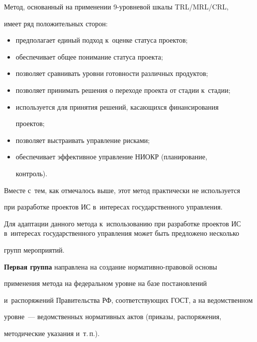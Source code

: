   Метод, основанный на применении 9-уров\-не\-вой шкалы TRL\!/\!MRL\!/\!CRL, 

имеет ряд положительных сторон:

  \begin{itemize}

  \item  предполагает единый подход к~оценке статуса проектов;

  \item обеспечивает общее понимание статуса проекта;

  \item позволяет сравнивать уровни готовности различных продуктов;

  \item позволяет принимать решения о переходе проекта от стадии к~стадии;

  \item используется для принятия решений, касающихся финансирования 

проектов;

  \item позволяет выстраивать управление рисками;

  \item обеспечивает эффективное управление НИОКР (планирование, 

контроль).

  \end{itemize}

  

  Вместе с~тем, как отмечалось выше, этот метод практически не используется 

при разработке проектов ИС в~интересах государственного управления.

  

  Для адаптации данного метода к~использованию при разработке проектов ИС в~интересах государственного управления может быть предложено несколько 

групп мероприятий. 

  

  \textbf{Первая группа} направлена на создание нор\-ма\-тив\-но-пра\-во\-вой основы 

применения метода на федеральном уровне на базе постановлений 

и~распоряжений Правительства РФ, соответствующих ГОСТ, а на ведомственном 

уровне~--- ведомственных нормативных актов (приказы, распоряжения, 

методические указания и~т.\,п.).

